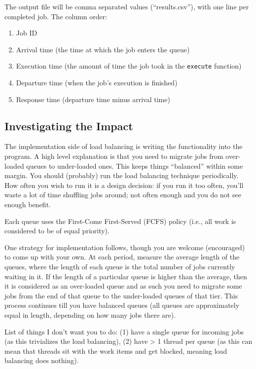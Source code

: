 \documentclass[letterpaper,10pt]{article}
\begin{document}
The output file will be comma separated values (``results.csv''), with one line per completed job. The column order:
\begin{enumerate}
	\item Job ID
	\item Arrival time (the time at which the job enters the queue)
	\item Execution time (the amount of time the job took in the \texttt{execute} function)
	\item Departure time (when the job's execution is finished)
	\item Response time (departure time minus arrival time)
\end{enumerate}


\subsection{Investigating the Impact}

The implementation side of load balancing is writing the functionality into the program. A high level explanation is that you need to migrate jobs from over-loaded queues to under-loaded ones. This keeps things ``balanced'' within some margin. You should (probably) run the load balancing technique periodically. How often you wish to run it is a design decision: if you run it too often, you'll waste a lot of time shuffling jobs around; not often enough and you do not see enough benefit.

Each queue uses the First-Come First-Served (FCFS) policy (i.e., all work is considered to be of equal priority).

One strategy for implementation follows, though you are welcome (encouraged) to come up with your own. At each period, measure the average length of the queues, where the length of each queue is the total number of jobs currently waiting in it. If the length of a particular queue is higher than the average, then it is considered as an over-loaded queue and as such you need to migrate some jobs from the end of that queue to the under-loaded queues of that tier. This process continues till you have balanced queues (all queues are approximately equal in length, depending on how many jobs there are).

List of things I don't want you to do: (1) have a single queue for incoming jobs (as this trivializes the load balancing), (2) have > 1 thread per queue (as this can mean that threads sit with the work items and get blocked, meaning load balancing does nothing).
\end{document}
